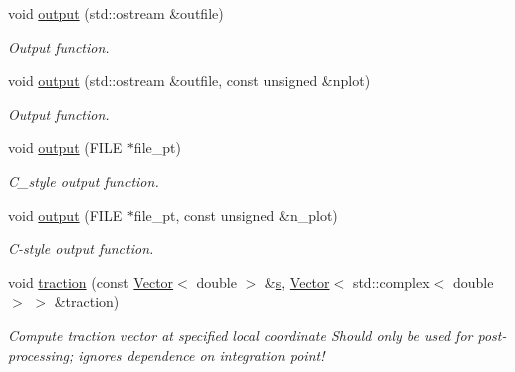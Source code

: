 \begin{DoxyCompactItemize}
void \hyperlink{classoomph_1_1PMLTimeHarmonicLinearElasticityTractionElement_a56ab485159ea913f58af2a4d984bd408}{output} (std\+::ostream \&outfile)
\begin{DoxyCompactList}\small\item\em Output function. \end{DoxyCompactList}\item 
void \hyperlink{classoomph_1_1PMLTimeHarmonicLinearElasticityTractionElement_ad2d5e08cb9d6b23687ad11cf7788764e}{output} (std\+::ostream \&outfile, const unsigned \&nplot)
\begin{DoxyCompactList}\small\item\em Output function. \end{DoxyCompactList}\item 
void \hyperlink{classoomph_1_1PMLTimeHarmonicLinearElasticityTractionElement_a91e943645cfd3e58d48fe9ad90d1a2d3}{output} (F\+I\+LE $\ast$file\+\_\+pt)
\begin{DoxyCompactList}\small\item\em C\+\_\+style output function. \end{DoxyCompactList}\item 
void \hyperlink{classoomph_1_1PMLTimeHarmonicLinearElasticityTractionElement_abbd6d562916430554b8b39fda992ef37}{output} (F\+I\+LE $\ast$file\+\_\+pt, const unsigned \&n\+\_\+plot)
\begin{DoxyCompactList}\small\item\em C-\/style output function. \end{DoxyCompactList}\item 
void \hyperlink{classoomph_1_1PMLTimeHarmonicLinearElasticityTractionElement_ae83042121b4033f28c95ca8899b02ee8}{traction} (const \hyperlink{classoomph_1_1Vector}{Vector}$<$ double $>$ \&\hyperlink{cfortran_8h_ab7123126e4885ef647dd9c6e3807a21c}{s}, \hyperlink{classoomph_1_1Vector}{Vector}$<$ std\+::complex$<$ double $>$ $>$ \&traction)
\begin{DoxyCompactList}\small\item\em Compute traction vector at specified local coordinate Should only be used for post-\/processing; ignores dependence on integration point! \end{DoxyCompactList}\end{DoxyCompactItemize}
